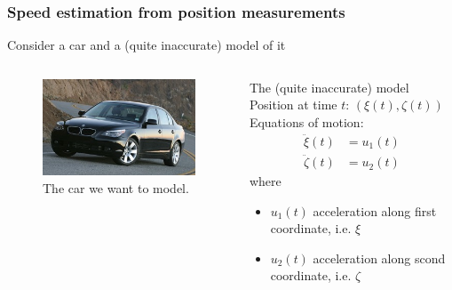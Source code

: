 \begin{frame} 
	\frametitle{Speed estimation from position measurements} 
	Consider a car and a (quite inaccurate) model of it
	\begin{columns}[onlytextwidth]
		\begin{figure}[h]
			\includegraphics[width=\textwidth]{fig/auto_real}%
			\caption*{The car we want to model.\footnotemark} 
		\end{figure}
		\begin{block}{The (quite inaccurate) model}
		Position at time $t$: $(\xi(t), \zeta(t))$ \\%
		Equations of motion:
		\begin{align*}
		  \ddot{\xi}(t)& = u_1(t) \\
		  \ddot{\zeta}(t)& = u_2(t)
		\end{align*}
		where 
		\begin{itemize}
			\item $u_1(t)$ acceleration along first coordinate, i.e. $\xi$\\
			\item $u_2(t)$ acceleration along scond coordinate, i.e. $\zeta$ 
		\end{itemize}
		\end{block}
	\end{columns}
	
	
\end{frame}

